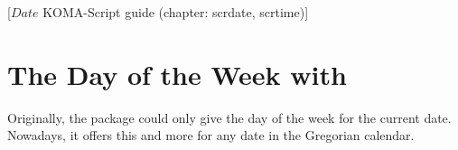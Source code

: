 %
%
%
%
%
%
%
%
% 
%
%
%
%

                 [$Date$
                  KOMA-Script guide (chapter: scrdate, scrtime)]


\chapter{The Day of the Week with }
\BeginIndexGroup
{}

Originally, the  package could only give the day of the week
for the current date. Nowadays, it offers this and more for any date in the
Gregorian calendar.

